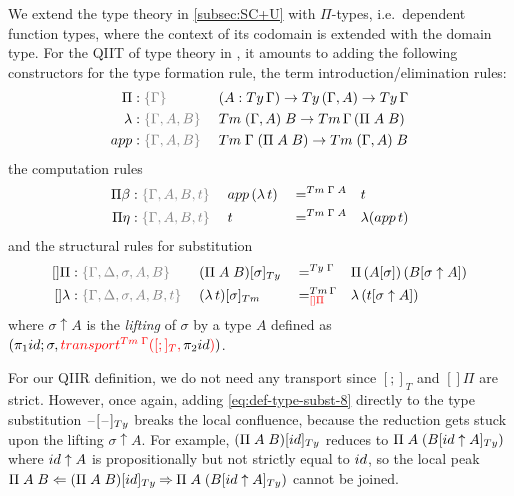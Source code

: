 \documentclass[a4paper,UKenglish,numberwithinsect,cleveref,thm-restate]{lipics-v2021}
\begin{document}
We extend the type theory in \cref{subsec:SC+U} with $\Pi$-types, i.e.\ dependent function types, where the context of its codomain is extended with the domain type.
For the QIIT of type theory in \cite{Altenkirch2016a}, it amounts to adding the following constructors for the type formation rule, the term introduction/elimination rules:
\begin{alignat*}{3}
  \Pi     &: \implicit{\Gamma}           \; && (A : \Ty\,\Gamma) \to \Ty\,(\Gamma, A) \to \Ty\,\Gamma \\
  \lambda &: \implicit{\Gamma, A, B}     \; && \Tm\;(\Gamma, A)\;B \to \Tm\,\Gamma\,(\Pi\;A\;B) \\
  \mathsf{app} &: \implicit{\Gamma, A, B}\; && \Tm\;\Gamma\;(\Pi\;A\;B) \to \Tm\;(\Gamma, A)\;B
\end{alignat*}
the computation rules
\begin{alignat*}{5}
  \Pi\beta           & : \implicit{\Gamma, A, B, t}\; && \mathsf{app}\,(\lambda\,t) && =^{\Tm\;\Gamma\;A} && t \\
  \Pi\eta            & : \implicit{\Gamma, A, B, t}\; && t                          && =^{\Tm\;\Gamma\;A} && \lambda(\mathsf{app}\,t)
\end{alignat*}
and the structural rules for substitution
\begin{alignat}{5}
  []\Pi              & : \implicit{\Gamma, \Delta, \sigma, A, B}\;    && \subTy{(\Pi\;A\;B)}{\sigma} && =^{\Ty\;\Gamma} && \Pi\,(\sub{A}{\sigma})\,(\sub{B}{\sigma\uparrow A}) \label{eq:def-type-subst-8} \\
  \mathsf{[]\lambda} & : \implicit{\Gamma, \Delta, \sigma, A, B, t}\; && \subTm{(\lambda\,t)}{\sigma} && =^{\Tm\,\Gamma}_{\alert{[]\Pi}} && \lambda\,(\sub{t}{\sigma \uparrow A}) \nonumber
\end{alignat}
where $\sigma \uparrow A$ is the \emph{lifting}  of $\sigma$ by a type $A$ defined as $(\pi_1\idS; \sigma, \alert{\transfib{\Tm\;\Gamma}{[;]_T}{\color{black}\pi_2\idS}})$. 

For our QIIR definition, %
we do not need any transport since $[;]_T$ and $[]\Pi$ are strict.
However, once again, adding \eqref{eq:def-type-subst-8} directly to the type substitution $\subTy{\blank}{\blank}$ breaks the local confluence, because the reduction gets stuck upon the lifting $\sigma \uparrow A$.
For example, $\subTy{(\Pi\;A\;B)}{\idS}$ reduces to $\Pi\;A\;(\subTy{B}{\idS \uparrow A})$ where $\idS \uparrow A$ is propositionally but not strictly equal to $\idS$, so the local peak $\Pi\;A\;B \Leftarrow \subTy{(\Pi\;A\;B)}{\idS} \reduce \Pi\;A\;(\subTy{B}{\idS \uparrow A})$ cannot be joined. 
\end{document}
